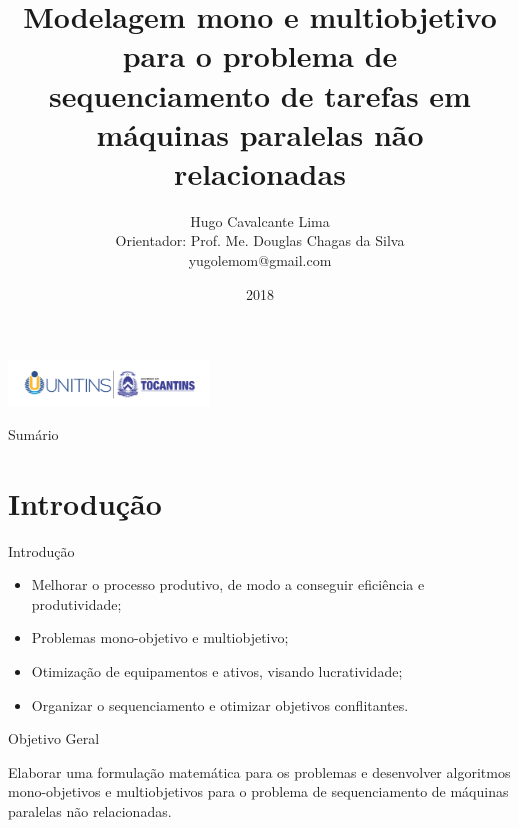 \documentclass[]{beamer}
\title{Modelagem mono e multiobjetivo para o 
problema de sequenciamento de tarefas em 
máquinas paralelas não relacionadas}
\author[Hugo Cavalcante Lima]{Hugo Cavalcante Lima \\ Orientador: Prof. Me. Douglas Chagas da Silva
{\\ \footnotesize\ttfamily yugolemom@gmail.com}}
\institute{%
	Universidade Estadual do Tocantins - UNITINS
	\\
	Curso de Sistemas de Informação
}
\date{2018}
\begin{document}
\begin{frame}

\begin{minipage}{1\linewidth}
  \centering
  \center
  \includegraphics[width=0.4\textwidth]{imagens/unitins.png}
 
\end{minipage}

\titlepage

\end{frame}

\begin{frame}{Sumário}
\tableofcontents
\end{frame}

\section{Introdução}
\begin{frame}{Introdução}
	\begin{itemize}
		\item Melhorar o processo produtivo, de modo a conseguir eficiência e produtividade;
		\item Problemas mono-objetivo e multiobjetivo;
		\item Otimização de equipamentos e ativos, visando lucratividade;
		\item Organizar o sequenciamento e otimizar objetivos conflitantes.
	\end{itemize}
\end{frame}

\begin{frame}{Objetivo Geral}
	
	Elaborar uma formulação matemática para os problemas e desenvolver algoritmos mono-objetivos 
	e multiobjetivos para o problema de sequenciamento de máquinas paralelas não relacionadas.

\end{frame}
\end{document}

